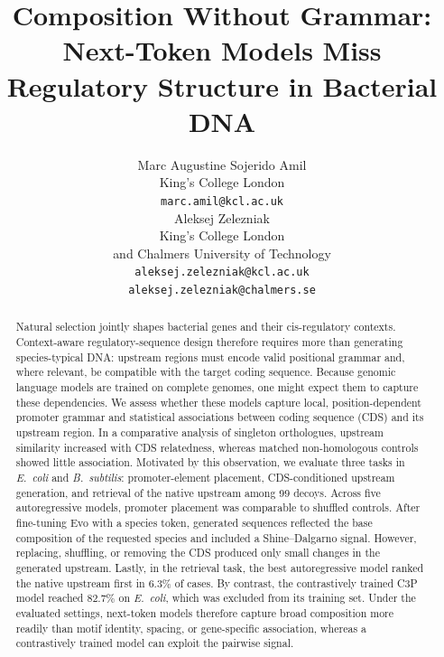 \documentclass{article}
\title{Composition Without Grammar: Next-Token Models Miss Regulatory Structure in Bacterial DNA}
\author{%
  Marc Augustine Sojerido Amil \\
  King's College London \\
  \texttt{marc.amil@kcl.ac.uk} \\
  \And
  Aleksej Zelezniak \\
  King's College London \\
  and Chalmers University of Technology \\
  \texttt{aleksej.zelezniak@kcl.ac.uk} \\
  \texttt{aleksej.zelezniak@chalmers.se} \\
}
\begin{document}
\maketitle

\begin{abstract}
Natural selection jointly shapes bacterial genes and their cis-regulatory
contexts. Context-aware regulatory-sequence design therefore requires more than
generating species-typical DNA: upstream regions must encode valid positional
grammar and, where relevant, be compatible with the target coding sequence.
Because genomic language models are trained on complete genomes, one might expect
them to capture these dependencies. We assess whether these models capture local,
position-dependent promoter grammar and statistical associations between coding
sequence (CDS) and its upstream region. In a comparative analysis of singleton
orthologues, upstream similarity increased with CDS relatedness, whereas matched
non-homologous controls showed little association. Motivated by this observation,
we evaluate three tasks in \emph{E.~coli} and \emph{B.~subtilis}: promoter-element
placement, CDS-conditioned upstream generation, and retrieval of the native
upstream among 99 decoys. Across five autoregressive models, promoter
placement was comparable to shuffled controls. After fine-tuning Evo with a
species token, generated sequences reflected the base composition of the requested
species and included a Shine--Dalgarno signal. However, replacing, shuffling, or
removing the CDS produced only small changes in the generated upstream. Lastly, in the
retrieval task, the best autoregressive model ranked the native upstream first in
$6.3\%$ of cases. By contrast, the contrastively trained C3P model reached
$82.7\%$ on \emph{E.~coli}, which was excluded from its training set. Under the
evaluated settings, next-token models therefore capture broad composition more
readily than motif identity, spacing, or gene-specific association, whereas a
contrastively trained model can exploit the pairwise signal.
\end{abstract}

\end{document}
